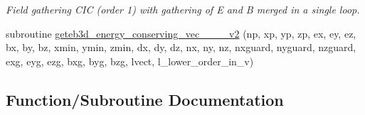 \begin{DoxyCompactItemize}
\begin{DoxyCompactList}\small\item\em Field gathering C\+IC (order 1) with gathering of E and B merged in a single loop. \end{DoxyCompactList}\item 
subroutine \hyperlink{field__gathering__3d__o3_8_f90_a6e3a3b1519fdd7090c55244b49a8d80f}{geteb3d\+\_\+energy\+\_\+conserving\+\_\+vec\+\_\+\_\+\_\+\_\+v2} (np, xp, yp, zp, ex, ey, ez, bx, by, bz,                                                                                                                                                                       xmin, ymin, zmin,                                                                                                                                                                                               dx, dy, dz, nx, ny, nz, nxguard, nyguard, nzguard,                                                                                                                                                                       exg, eyg, ezg, bxg, byg, bzg, lvect, l\+\_\+lower\+\_\+order\+\_\+in\+\_\+v)
\end{DoxyCompactItemize}


\subsection{Function/\+Subroutine Documentation}
